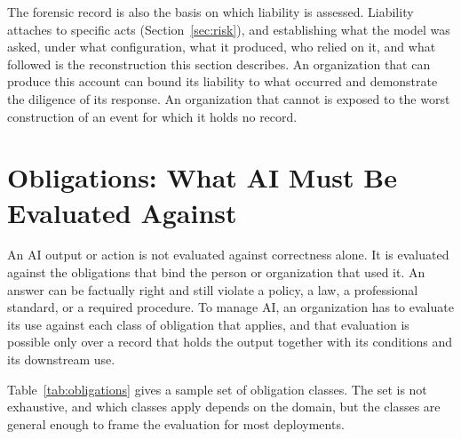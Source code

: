 \documentclass[11pt]{article}
\begin{document}
The forensic record is also the basis on which liability is assessed. Liability
attaches to specific acts (Section~\ref{sec:risk}), and establishing what the model
was asked, under what configuration, what it produced, who relied on it, and what
followed is the reconstruction this section describes. An organization that can
produce this account can bound its liability to what occurred and demonstrate the
diligence of its response. An organization that cannot is exposed to the worst
construction of an event for which it holds no record.

\section{Obligations: What AI Must Be Evaluated Against}
\label{sec:obligations}

An AI output or action is not evaluated against correctness alone. It is
evaluated against the obligations that bind the person or organization that used
it. An answer can be factually right and still violate a policy, a law, a
professional standard, or a required procedure. To manage AI, an organization has
to evaluate its use against each class of obligation that applies, and that
evaluation is possible only over a record that holds the output together with its
conditions and its downstream use.

Table~\ref{tab:obligations} gives a sample set of obligation classes. The set is
not exhaustive, and which classes apply depends on the domain, but the classes
are general enough to frame the evaluation for most deployments.
\end{document}
